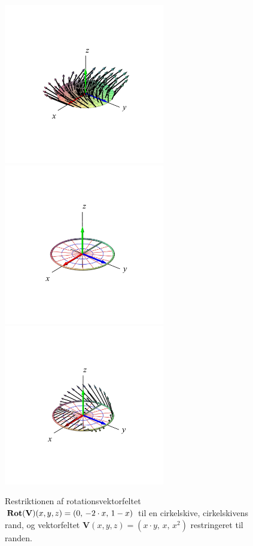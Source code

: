 \begin{figure}[h]
\centerline{\includegraphics[height=70mm]{FIGS/plotDiskStokes4}\includegraphics[height=70mm]{FIGS/plotDiskStokes5}\includegraphics[height=70mm]{FIGS/plotDiskStokes6}}
\begin{center}
\caption{\small{Restriktionen af  rotationsvektorfeltet $\operatorname{\mathbf{Rot}}(\mathbf{V})(x,y,z)= (0, \, -2\cdot x, \, 1-x)$ til en cirkelskive, cirkelskivens rand, og vektorfeltet $\mathbf{V}(x,y,z) = (x\cdot y, \, x, \, x^{2})$ restringeret til randen.}}
\label{figDiskStokesB}
\end{center}
\end{figure}



